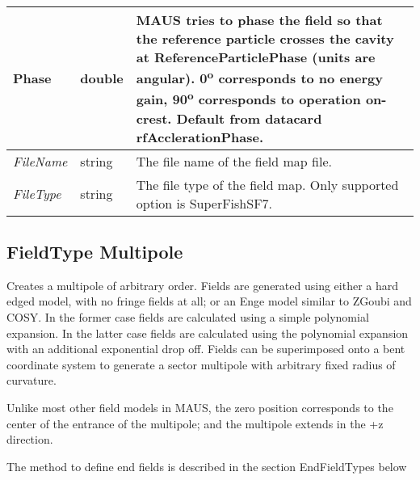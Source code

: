 \begin{center}
\begin{supertabular}{|m{3.665cm}|m{1.278cm}|m{12.052cm}|}
Phase &
double &
MAUS tries to phase the field so that the reference particle crosses the cavity at ReferenceParticlePhase (units are
angular). 0\textsuperscript{o} corresponds to no energy gain, 90\textsuperscript{o} corresponds to operation on-crest.
Default from datacard rfAcclerationPhase.\\\hline
{\itshape FileName} &
string &
The file name of the field map file.\\\hline
{\itshape FileType} &
string &
The file type of the field map. Only supported option is SuperFishSF7.\\\hline
\end{supertabular}
\end{center}

\subsection{FieldType Multipole}
Creates a multipole of arbitrary order. Fields are generated using either a hard edged model, with no fringe fields at
all; or an Enge model similar to ZGoubi and COSY. In the former case fields are calculated using a simple polynomial
expansion. In the latter case fields are calculated using the polynomial expansion with an additional exponential drop
off. Fields can be superimposed onto a bent coordinate system to generate a sector multipole with arbitrary fixed
radius of curvature.

Unlike most other field models in MAUS, the zero position corresponds to the center of the entrance of the multipole;
and the multipole extends in the +z direction.

The method to define end fields is described in the section EndFieldTypes below

